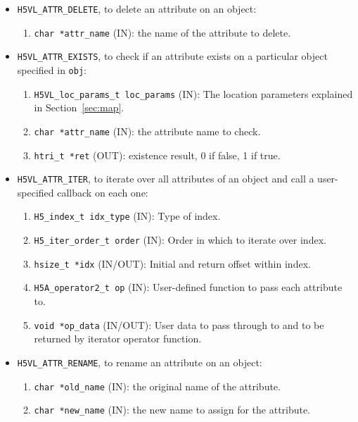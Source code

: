 \begin{itemize}
\item \texttt{H5VL\_ATTR\_DELETE}, to delete an attribute on an object:
  \begin{enumerate}
  \item \texttt{char *attr\_name} (IN): the name of the attribute to delete.
  \end{enumerate}

\item \texttt{H5VL\_ATTR\_EXISTS}, to check if an attribute exists on a
  particular object specified in \texttt{obj}:
  \begin{enumerate}
  \item \texttt{H5VL\_loc\_params\_t loc\_params} (IN): The location parameters
    explained in Section~\ref{sec:map}.
  \item \texttt{char *attr\_name} (IN): the attribute name to check.
  \item \texttt{htri\_t *ret} (OUT): existence result, 0 if false, 1 if true.
  \end{enumerate}

\item \texttt{H5VL\_ATTR\_ITER}, to iterate over all attributes of an object and call a user-specified callback on each one:
  \begin{enumerate}
  \item \texttt{H5\_index\_t idx\_type} (IN): Type of index.\\
  \item \texttt{H5\_iter\_order\_t order} (IN): Order in which to iterate over index.\\
  \item \texttt{hsize\_t *idx} (IN/OUT): Initial and return offset within index.\\
  \item \texttt{H5A\_operator2\_t op} (IN): User-defined function to pass each attribute to. \\
  \item \texttt{void *op\_data} (IN/OUT): User data to pass through to and to be returned by iterator operator function. \\
  \end{enumerate}

\item \texttt{H5VL\_ATTR\_RENAME}, to rename an attribute on an object:
  \begin{enumerate}
  \item \texttt{char *old\_name} (IN): the original name of the attribute.
  \item \texttt{char *new\_name} (IN): the new name to assign for the attribute.
  \end{enumerate}

\end{itemize}

